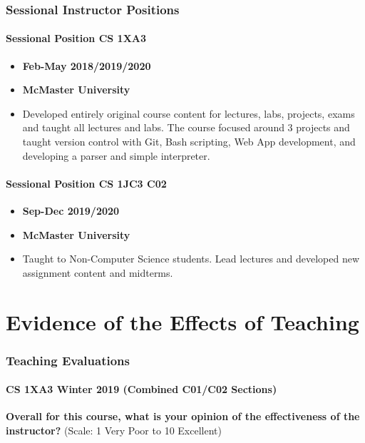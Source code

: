 \documentclass[12pt]{report}
\begin{document}
\section{Sessional Instructor Positions}
\label{sec:org8984049}
\subsection{Sessional Position CS 1XA3}
\label{sec:orga6bfb36}
\begin{itemize}
\item \textbf{Feb-May 2018/2019/2020}
\item \textbf{McMaster University}
\item Developed entirely original course content for lectures, labs, projects,
exams and taught all lectures and labs. The course focused around 3 projects
and taught version control with Git, Bash scripting, Web App development, and
developing a parser and simple interpreter.
\end{itemize}

\subsection{Sessional Position CS 1JC3 C02}
\label{sec:orga4c5816}
\begin{itemize}
\item \textbf{Sep-Dec 2019/2020}
\item \textbf{McMaster University}
\item Taught to Non-Computer Science students. Lead lectures and developed new
assignment content and midterms.
\end{itemize}

\part{Evidence of the Effects of Teaching}
\label{sec:org922a7eb}
\section{Teaching Evaluations}
\label{sec:orgbe5185e}
\subsection{CS 1XA3 Winter 2019 (Combined C01/C02 Sections)}
\label{sec:orgbf51254}
\textbf{Overall for this course, what is your opinion of the effectiveness of the
instructor?} (Scale: 1 Very Poor to 10 Excellent)
\end{document}
